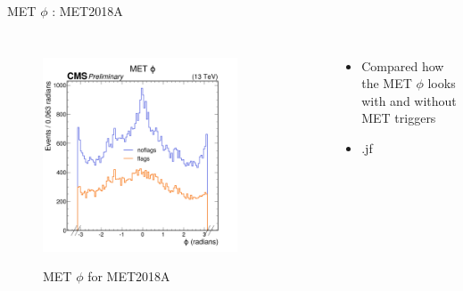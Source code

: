 \documentclass[10pt,xcolor=dvipsnames,aspectratio=169]{beamer}
\begin{document}
  \begin{frame}[fragile]{MET $\phi$ : MET2018A} 
    \begin{columns}
    \begin{figure} 
    \centering 
     \includegraphics[width=0.8\textwidth]{../Archive/KinemPlots/DataphiMETflags.png }
    \label{METDataflagphi} 
    \caption{MET $\phi$ for MET2018A}
    \end{figure} 
    \begin{itemize} 
    \raggedright 
    \small
    \item Compared how the MET $\phi$ looks with and without MET triggers
    \item .jf
    \end{itemize}
    \end{columns} 
    \end{frame}
\end{document}
